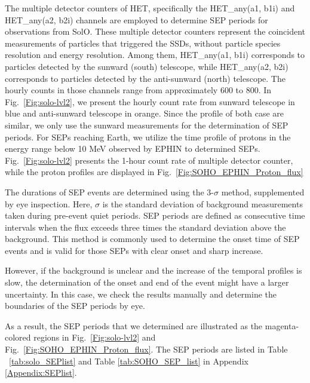 The multiple detector counters of \ac{HET}, specifically the HET\_any(a1, b1i) and HET\_any(a2, b2i) channels are employed to determine \ac{SEP} periods for observations from \ac{SolO}. 
These multiple detector counters represent the coincident measurements of particles that triggered the \acp{SSD}, without particle species resolution and energy resolution. Among them, HET\_any(a1, b1i) corresponds to particles detected by the sunward (south) telescope, while HET\_any(a2, b2i) corresponds to particles detected by the anti-sunward (north) telescope. The hourly counts in those channels range from approximately 600 to 800. In Fig.~\ref{Fig:solo-lvl2}, we present the hourly count rate from sunward telescope in blue and anti-sunward telescope in orange. Since the profile of both case are similar, we only use the sunward measurements for the determination of \ac{SEP} periods. 
For \acp{SEP} reaching Earth, we utilize the time profile of protons in the energy range below 10 MeV observed by \ac{EPHIN} to determined \acp{SEP}. 
Fig.~\ref{Fig:solo-lvl2} presents the 1-hour count rate of multiple detector counter, while the proton profiles are displayed in Fig.~\ref{Fig:SOHO_EPHIN_Proton_flux}

The durations of \ac{SEP} events are determined using the 3-$\sigma$ method, supplemented by eye inspection. Here, $\sigma$ is the standard deviation of background measurements taken during pre-event quiet periods. \ac{SEP} periods are defined as consecutive time intervals when the flux exceeds three times the standard deviation above the background. This method is commonly used to determine the onset time of \ac{SEP} events and is valid for those \acp{SEP} with clear onset and sharp increase.

However, if the background is unclear and the increase of the temporal profiles is slow, the determination of the onset and end of the event might have a larger uncertainty. In this case, we check the results manually and determine the boundaries of the \ac{SEP} periods by eye.

As a result, the \ac{SEP} periods that we determined are illustrated as the magenta-colored regions in Fig.~\ref{Fig:solo-lvl2} and Fig.~\ref{Fig:SOHO_EPHIN_Proton_flux}. The \ac{SEP} periods are listed in Table ~\ref{tab:solo_SEPlist} and Table \ref{tab:SOHO_SEP_list} in Appendix \ref{Appendix:SEPlist}.





